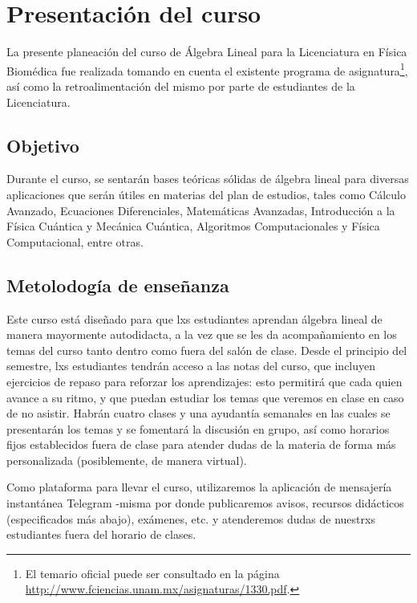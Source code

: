 \chapter*{Presentación del curso} \label{Chap: Presentación}

La presente planeación del curso de Álgebra Lineal para la Licenciatura en Física Biomédica fue realizada tomando en cuenta el existente programa de asignatura\footnote{El temario oficial puede ser consultado en la página \url{http://www.fciencias.unam.mx/asignaturas/1330.pdf}.}, así como la retroalimentación del mismo por parte de estudiantes de la Licenciatura.

\section*{Objetivo} \label{Ssec: Objetivo}

Durante el curso, se sentarán bases teóricas sólidas de álgebra lineal para diversas aplicaciones que serán útiles en materias del plan de estudios, tales como Cálculo Avanzado, Ecuaciones Diferenciales, Matemáticas Avanzadas, Introducción a la Física Cuántica y Mecánica Cuántica, Algoritmos Computacionales y Física Computacional, entre otras.

\section*{Metolodogía de enseñanza}

 Este curso está diseñado para que lxs estudiantes aprendan álgebra lineal de manera mayormente autodidacta, a la vez que se les da acompañamiento en los temas del curso tanto dentro como fuera del salón de clase. Desde el principio del semestre, lxs estudiantes tendrán acceso a las notas del curso, que incluyen ejercicios de repaso para reforzar los aprendizajes: esto permitirá que cada quien avance a su ritmo, y que puedan estudiar los temas que veremos en clase en caso de no asistir. Habrán cuatro clases y una ayudantía semanales en las cuales se presentarán los temas y se fomentará la discusión en grupo, así como horarios fijos establecidos fuera de clase para atender dudas de la materia de forma más personalizada (posiblemente, de manera virtual).

 \vspace{3mm}
  Como plataforma para llevar el curso, utilizaremos la aplicación de mensajería instantánea Telegram -misma por donde publicaremos avisos, recursos didácticos (especificados más abajo), exámenes, etc. y atenderemos dudas de nuestrxs estudiantes fuera del horario de clases.

